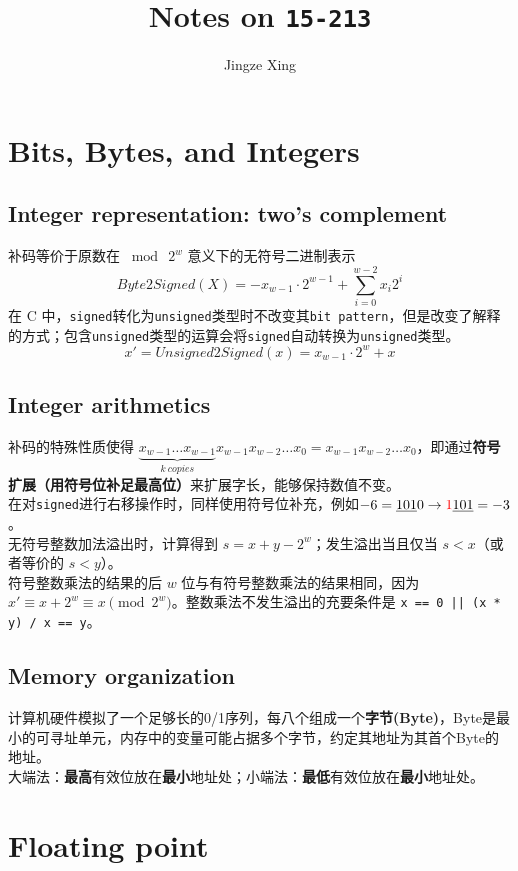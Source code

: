 \documentclass[10pt,fontset=windows]{article}
\title{Notes on \texttt{15-213}}
\author{Jingze Xing}
\def\ttt#1{\texttt{#1}}
\begin{document}
\maketitle
\tableofcontents
\newpage
\section{Bits, Bytes, and Integers}
\subsection{Integer representation: two's complement}
补码等价于原数在 $\bmod\ 2^w$ 意义下的无符号二进制表示
$$Byte2Signed(X)=-x_{w-1}\cdot 2^{w-1}+\sum_{i=0}^{w-2}x_i2^{i}$$
\indent 在 C 中，\ttt{signed}转化为\ttt{unsigned}类型时不改变其\ttt{bit pattern}，但是改变了解释的方式；包含\ttt{unsigned}类型的运算会将\ttt{signed}自动转换为\ttt{unsigned}类型。
$$x'=Unsigned2Signed(x)=x_{w-1}\cdot 2^w+x$$
\subsection{Integer arithmetics}
补码的特殊性质使得 $\underbrace{x_{w-1}\dots x_{w-1}}\limits_{k\ copies}x_{w-1}x_{w-2}\dots x_0=x_{w-1}x_{w-2}\dots x_0$，即通过\textbf{符号扩展（用符号位补足最高位）}来扩展字长，能够保持数值不变。\\
\indent 在对\ttt{signed}进行右移操作时，同样使用符号位补充，例如$-6=\underline{101}0\rightarrow {\color{red}1}\underline{101}=-3$。\\
\indent 无符号整数加法溢出时，计算得到 $s=x+y-2^w$；发生溢出当且仅当 $s<x$（或者等价的 $s<y$）。\\
\indent 符号整数乘法的结果的后 $w$ 位与有符号整数乘法的结果相同，因为 $x'\equiv x+2^w\equiv x\pmod{2^w}$。整数乘法不发生溢出的充要条件是 \ttt{x == 0 || (x * y) / x == y}。
\subsection{Memory organization}
计算机硬件模拟了一个足够长的0/1序列，每八个组成一个\textbf{字节(Byte)}，Byte是最小的可寻址单元，内存中的变量可能占据多个字节，约定其地址为其首个Byte的地址。\\
\indent 大端法：\textbf{最高}有效位放在\textbf{最小}地址处；小端法：\textbf{最低}有效位放在\textbf{最小}地址处。
\section{Floating point}
\end{document}

